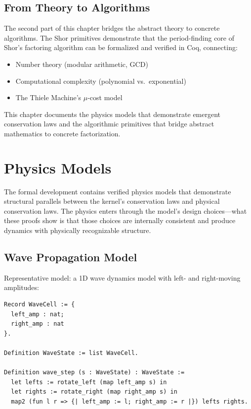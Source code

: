 \subsection{From Theory to Algorithms}

The second part of this chapter bridges the abstract theory to concrete algorithms. The Shor primitives demonstrate that the period-finding core of Shor's factoring algorithm can be formalized and verified in Coq, connecting:
\begin{itemize}
    \item Number theory (modular arithmetic, GCD)
    \item Computational complexity (polynomial vs.\ exponential)
    \item The Thiele Machine's $\mu$-cost model
\end{itemize}

This chapter documents the physics models that demonstrate emergent conservation laws and the algorithmic primitives that bridge abstract mathematics to concrete factorization.

\section{Physics Models}


The formal development contains verified physics models that demonstrate structural parallels between the kernel's conservation laws and physical conservation laws. The physics enters through the model's design choices---what these proofs show is that those choices are internally consistent and produce dynamics with physically recognizable structure.

\subsection{Wave Propagation Model}

Representative model: a 1D wave dynamics model with left- and right-moving amplitudes:
\begin{lstlisting}
Record WaveCell := {
  left_amp : nat;
  right_amp : nat
}.

Definition WaveState := list WaveCell.

Definition wave_step (s : WaveState) : WaveState :=
  let lefts := rotate_left (map left_amp s) in
  let rights := rotate_right (map right_amp s) in
  map2 (fun l r => {| left_amp := l; right_amp := r |}) lefts rights.
\end{lstlisting}

